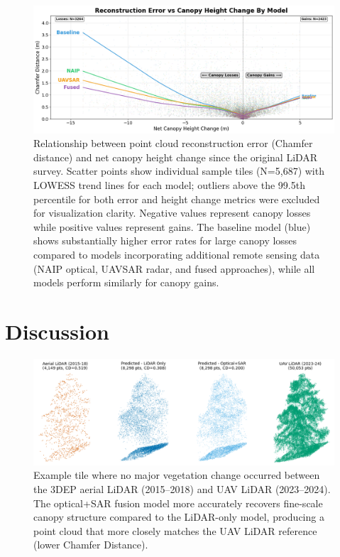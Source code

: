 \documentclass[preprints,article,accept,pdftex,moreauthors]{Definitions/mdpi}
\begin{document}
\begin{figure}
    \centering
    \includegraphics[width=1\linewidth]{manuscript//figures/error_vs_cnpy_chng.png}
    \caption{Relationship between point cloud reconstruction error (Chamfer distance) and net canopy height change since the original LiDAR survey. Scatter points show individual sample tiles (N=5,687) with LOWESS trend lines for each model; outliers above the 99.5th percentile for both error and height change metrics were excluded for visualization clarity. Negative values represent canopy losses while positive values represent gains. The baseline model (blue) shows substantially higher error rates for large canopy losses compared to models incorporating additional remote sensing data (NAIP optical, UAVSAR radar, and fused approaches), while all models perform similarly for canopy gains.}
    \label{fig:error_vs_cnpy_chng}
\end{figure}

\section{Discussion}


\begin{figure}
    \centering
    \includegraphics[width=1\linewidth]{manuscript/figures/model_output_example.png}
    \caption{Example tile where no major vegetation change occurred between the 3DEP aerial LiDAR (2015--2018) and UAV LiDAR (2023--2024). The optical+SAR fusion model more accurately recovers fine-scale canopy structure compared to the LiDAR-only model, producing a point cloud that more closely matches the UAV LiDAR reference (lower Chamfer Distance).}
    \label{fig:enter-label}
\end{figure}
\end{document}
